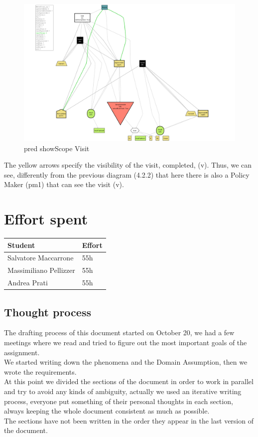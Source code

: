 \documentclass[10pt]{report}
\begin{document}
\begin{figure}[H]
    \centering
    \includegraphics[width=450px]{Alloy/reportScope.png}
    \caption{pred showScope Visit}
\end{figure}
The yellow arrows specify the visibility of the visit, completed, (v). Thus, we can see, differently from the previous diagram (4.2.2) that here there is also a Policy Maker (pm1) that can see the visit (v).
\chapter{Effort spent}
\begin{table}[H]
\centering
\begin{tabular}{|l|l|}
\hline
\textbf{Student}       & \textbf{Effort} \\ \hline
Salvatore Maccarrone   & 55h             \\ \hline
Massimiliano Pellizzer & 55h             \\ \hline
Andrea Prati           & 55h             \\ \hline
\end{tabular}
\end{table}
\section{Thought process}
The drafting process of this document started on October 20,  we had a few meetings where we read and tried to figure out the most important goals of the assignment.\\ We started writing down the phenomena and the Domain Assumption, then we wrote the requirements.\\
At this point we divided the sections of the document in order to work in parallel and try to avoid any kinds of ambiguity, actually we used an iterative writing process, everyone put something of their personal thoughts in each section, always keeping the whole document consistent as much as possible. \\
The sections have not been written in the order they appear in the last version of the document.
\end{document}
